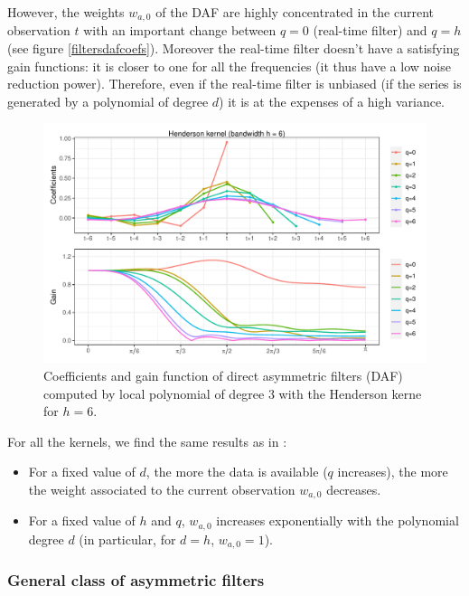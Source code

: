 \documentclass[
  12pt,
  ,
  a4paper]{article}
\newcommand\1{\mathds{1}}
\begin{document}
However, the weights \(w_{a,0}\) of the DAF are highly concentrated in the current observation \(t\) with an important change between \(q=0\) (real-time filter) and \(q=h\) (see figure \ref{filtersdafcoefs}).
Moreover the real-time filter doesn't have a satisfying gain functions: it is closer to one for all the frequencies (it thus have a low noise reduction power).
Therefore, even if the real-time filter is unbiased (if the series is generated by a polynomial of degree \(d\)) it is at the expenses of a high variance.

\begin{figure}[!ht]
\includegraphics[width=\textwidth]{img/daf/coef_gain_1}
\caption{Coefficients and gain function of direct asymmetric filters (DAF) computed by local polynomial of degree $3$ with the Henderson kerne for $h=6$.}\label{fig:filtersdafcoefs}\footnotesize
\end{figure}

For all the kernels, we find the same results as in \textcite{proietti2008}:

\begin{itemize}
\item
  For a fixed value of \(d\), the more the data is available (\(q\) increases), the more the weight associated to the current observation \(w_{a,0}\) decreases.
\item
  For a fixed value of \(h\) and \(q\), \(w_{a,0}\) increases exponentially with the polynomial degree \(d\) (in particular, for \(d=h\), \(w_{a,0}=1\)).
\end{itemize}

\hypertarget{general-class-of-asymmetric-filters}{%
\subsubsection{General class of asymmetric filters}\label{general-class-of-asymmetric-filters}}
\end{document}
